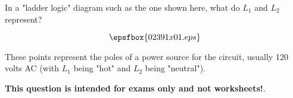 

In a "ladder logic" diagram such as the one shown here, what do $L_1$ and $L_2$ represent?

$$\epsfbox{02391x01.eps}$$







These points represent the poles of a power source for the circuit, usually 120 volts AC (with $L_1$ being "hot" and $L_2$ being "neutral").







{\bf This question is intended for exams only and not worksheets!}.




